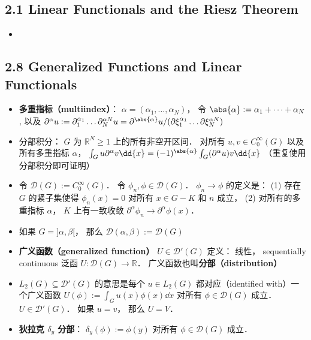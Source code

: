 \subsection{2.1 Linear Functionals and the Riesz Theorem}
\begin{itemize}
\item 
\end{itemize}

\subsection{2.8 Generalized Functions and Linear Functionals}
\begin{itemize}
\item \textbf{多重指标（multiindex）}： $\alpha = (\alpha_1, \dots, \alpha_N)$， 令 $\abs{\alpha} := \alpha_1 + \dots + \alpha_N$, 以及 $\partial^\alpha u := \partial_1^{\alpha_1} \dots \partial_N^{\alpha N} u = \partial^{\abs{\alpha}} u/ (\partial\xi_1^{\alpha_1} \dots \partial\xi_N^{\alpha N})$

\item 分部积分： $G$ 为 $\mathbb R^N \ge 1$ 上的所有非空开区间． 对所有 $u, v \in C_0^\infty(G)$ 以及所有多重指标 $\alpha$， $\int_G u\partial^\alpha v \dd{x} = (-1)^{\abs{\alpha}} \int_G (\partial^\alpha u)v \dd{x}$ （重复使用分部积分即可证明）

\item 令 $\mathcal D(G) := C_0^\infty(G)$． 令 $\phi_n, \phi \in \mathcal D(G)$． $\phi_n \to \phi$ 的定义是： (1) 存在 $G$ 的紧子集使得 $\phi_n(x) = 0$ 对所有 $x \in G-K$ 和 $n$ 成立， (2) 对所有的多重指标 $\alpha$， $K$ 上有一致收敛 $\partial^\alpha \phi_n \to \partial^\alpha \phi(x)$．

\item 如果 $G = ]\alpha,\beta[$， 那么 $\mathcal D(\alpha,\beta) := \mathcal D(G)$

\item \textbf{广义函数（generalized function）} $U \in \mathcal D'(G)$ 定义： 线性， sequentially continuous 泛函 $U: \mathcal D(G) \to \mathbb R$． 广义函数也叫\textbf{分部（distribution）}

\item $L_2(G) \subseteq \mathcal D'(G)$ 的意思是每个 $u\in L_2(G)$ 都对应（identified with）一个广义函数 $U(\phi) := \int_G u(x) \phi(x) \dd{x}$ 对所有 $\phi \in \mathcal D(G)$ 成立． $U \in \mathcal D'(G)$． 如果 $u = v$， 那么 $U = V$．

\item \textbf{狄拉克 $\delta_y$ 分部}： $\delta_y(\phi) := \phi(y)$ 对所有 $\phi\in\mathcal D(G)$ 成立．


\end{itemize}
